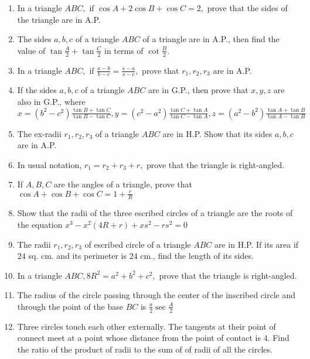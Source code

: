 \begin{enumerate}
\item In a triangle $ABC,$ if $\cos A + 2\cos B + \cos C = 2,$ prove that the sides of the triangle are in A.P.

\item The sides $a, b, c$ of a triangle $ABC$ of a triangle are in A.P., then find the value of $\tan\frac{A}{2} +
   \tan\frac{C}{2}$ in terms of $\cot\frac{B}{2}.$

\item In a triangle $ABC,$ if $\frac{a - b}{b - c}= \frac{s - a}{s - c},$ prove that $r_1, r_2, r_3$ are in A.P.

\item If the sides $a, b, c$ of a triangle $ABC$ are in G.P., then prove that $x, y, z$ are also in G.P., where
   $x = (b^2 - c^2)\frac{\tan B + \tan C}{\tan B - \tan C}, y = (c^2 - a^2)\frac{\tan C + \tan A}{\tan C - \tan A}, z =
   (a^2 - b^2)\frac{\tan A + \tan B}{\tan A - \tan B}$

\item The ex-radii $r_1, r_2, r_3$ of a triangle $ABC$ are in H.P. Show that its sides $a, b, c$ are in A.P.

\item In usual notation, $r_1 = r_2 + r_3 + r,$ prove that the triangle is right-angled.

\item If $A, B, C$ are the angles of a triangle, prove that $\cos A + \cos B + \cos C = 1 + \frac{r}{R}$

\item Show that the radii of the three escribed circles of a triangle are the roots of the equation $x^3 - x^2(4R + r) + xs^2 -
   rs^2 = 0$

\item The radii $r_1, r_2, r_3$ of escribed circle of a triangle $ABC$ are in H.P. If its area if $24$ sq. cm. and
   its perimeter is $24$ cm., find the length of its sides.

\item In a triangle $ABC, 8R^2 = a^2 + b^2 + c^2,$ prove that the triangle is right-angled.

\item The radius of the circle passing through the center of the inscribed circle and through the point of the base $BC$ is
   $\frac{a}{2}\sec\frac{A}{2}$

\item Three circles touch each other externally. The tangents at their point of connect meet at a point whose distance from the point
   of contact is $4.$ Find the ratio of the product of radii to the sum of of radii of all the circles.


\end{enumerate}
